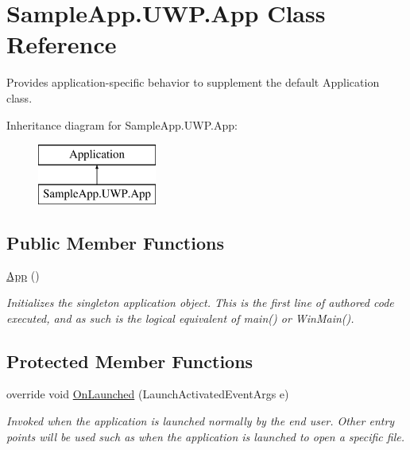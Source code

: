 \hypertarget{class_sample_app_1_1_u_w_p_1_1_app}{}\section{Sample\+App.\+U\+W\+P.\+App Class Reference}
\label{class_sample_app_1_1_u_w_p_1_1_app}


Provides application-\/specific behavior to supplement the default Application class.  


Inheritance diagram for Sample\+App.\+U\+W\+P.\+App\+:\begin{figure}[H]
\begin{center}
\leavevmode
\includegraphics[height=2.000000cm]{class_sample_app_1_1_u_w_p_1_1_app}
\end{center}
\end{figure}
\subsection*{Public Member Functions}
\begin{DoxyCompactItemize}
\item 
\hyperlink{class_sample_app_1_1_u_w_p_1_1_app_a3280ad5af7da556e5e9bb4ba13df00ed}{App} ()
\begin{DoxyCompactList}\small\item\em Initializes the singleton application object. This is the first line of authored code executed, and as such is the logical equivalent of main() or Win\+Main(). \end{DoxyCompactList}\end{DoxyCompactItemize}
\subsection*{Protected Member Functions}
\begin{DoxyCompactItemize}
\item 
override void \hyperlink{class_sample_app_1_1_u_w_p_1_1_app_ad225ddba4d1796a2943c660f4aeb6d30}{On\+Launched} (Launch\+Activated\+Event\+Args e)
\begin{DoxyCompactList}\small\item\em Invoked when the application is launched normally by the end user. Other entry points will be used such as when the application is launched to open a specific file. \end{DoxyCompactList}\end{DoxyCompactItemize}


